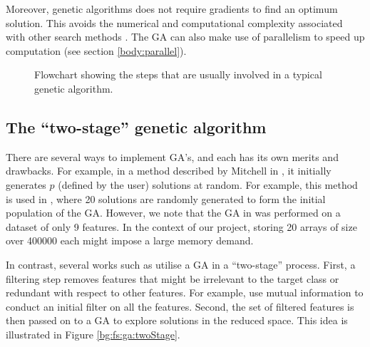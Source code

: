 \documentclass[12pt, twoside, a4paper]{report}
\begin{document}
Moreover, genetic algorithms does not require gradients to find an optimum solution. This avoids the numerical and computational complexity associated with other search methods \cite{RefWorks:242}. The GA can also make use of parallelism to speed up computation (see section \ref{body:parallel}).

\begin{figure}
\centering
{}
\caption{Flowchart showing the steps that are usually involved in a typical genetic algorithm.}
\label{bg:fs:ga:flowchart}
\end{figure}

\subsection{The ``two-stage'' genetic algorithm}
There are several ways to implement GA's, and each has its own merits and drawbacks. For example, in a method described by Mitchell in \cite{RefWorks:205}, it initially generates $p$ (defined by the user) solutions at random. For example, this method is used in \cite{RefWorks:206}, where 20 solutions are randomly generated to form the initial population of the GA. However, we note that the GA in \cite{RefWorks:206} was performed on a dataset of only 9 features. In the context of our project, storing 20 arrays of size over 400000 each might impose a large memory demand.

In contrast, several works such as \cite{RefWorks:197, RefWorks:198, RefWorks:199, RefWorks:200, RefWorks:203} utilise a GA in a ``two-stage'' process. First, a filtering step removes features that might be irrelevant to the target class or redundant with respect to other features. For example, \cite{RefWorks:197, RefWorks:198, RefWorks:203} use mutual information to conduct an initial filter on all the features. Second, the set of filtered features is then passed on to a GA to explore solutions in the reduced space. This idea is illustrated in Figure \ref{bg:fs:ga:twoStage}.
\end{document}
